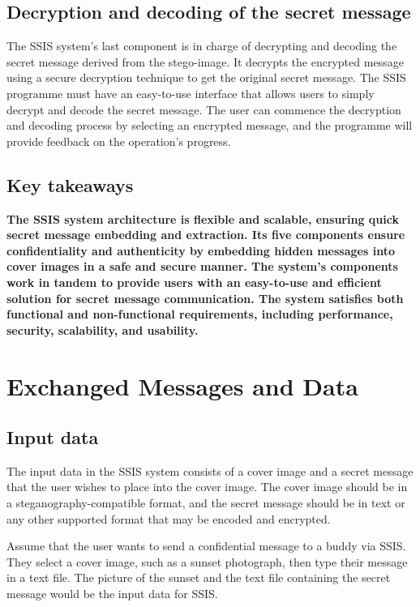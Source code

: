 \section{Decryption and decoding of the secret message}
The SSIS system's last component is in charge of decrypting and decoding the secret message derived from the stego-image. It decrypts the encrypted message using a secure decryption technique to get the original secret message.
The SSIS programme must have an easy-to-use interface that allows users to simply decrypt and decode the secret message. The user can commence the decryption and decoding process by selecting an encrypted message, and the programme will provide feedback on the operation's progress.
\begin{center}
\section{Key takeaways}
\textbf{The SSIS system architecture is flexible and scalable, ensuring quick secret message embedding and extraction. Its five components ensure confidentiality and authenticity by embedding hidden messages into cover images in a safe and secure manner. The system's components work in tandem to provide users with an easy-to-use and efficient solution for secret message communication. The system satisfies both functional and non-functional requirements, including performance, security, scalability, and usability.}

\end{center}

\chapter{Exchanged Messages and Data}
\section{Input data}
The input data in the SSIS system consists of a cover image and a secret message that the user wishes to place into the cover image. The cover image should be in a steganography-compatible format, and the secret message should be in text or any other supported format that may be encoded and encrypted.

Assume that the user wants to send a confidential message to a buddy via SSIS. They select a cover image, such as a sunset photograph, then type their message in a text file. The picture of the sunset and the text file containing the secret message would be the input data for SSIS.

